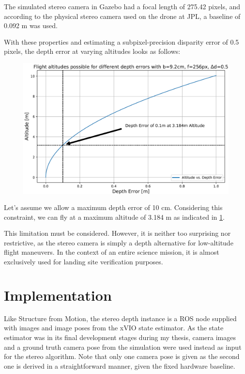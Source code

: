 The simulated stereo camera in Gazebo had a focal length of 275.42 pixels, and according to the physical stereo camera used on the drone at JPL, a baseline of 0.092 m was used.

With these properties and estimating a subpixel-precision disparity error of 0.5 pixels, the depth error at varying altitudes looks as follows:

\begin{figure}
    \centering
    \includegraphics[scale=0.32]{images/stereo_camera_depth/stereo_limit.png}
    \label{fig:stereo_limit}
\end{figure}

Let's assume we allow a maximum depth error of 10 cm. Considering this constraint, we can fly at a maximum altitude of 3.184 m as indicated in \cref{fig:stereo_limit}.

This limitation must be considered. However, it is neither too surprising nor restrictive, as the stereo camera is simply a depth alternative for low-altitude flight maneuvers. In the context of an entire science mission, it is almost exclusively used for landing site verification purposes.

\section{Implementation}

Like Structure from Motion, the stereo depth instance is a ROS node supplied with images and image poses from the xVIO state estimator. As the state estimator was in its final development stages during my thesis, camera images and a ground truth camera pose from the simulation were used instead as input for the stereo algorithm. Note that only one camera pose is given as the second one is derived in a straightforward manner, given the fixed hardware baseline.

